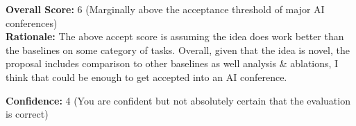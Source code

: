 \begin{tcolorbox}[colback=green!10!white, colframe=green!80!black, title=\textbf{Reviewer 1}]
\vspace{10pt}

\textbf{Overall Score:} 6 (Marginally above the acceptance threshold of major AI conferences)\\
\textbf{Rationale:} The above accept score is assuming the idea does work better than the baselines on some category of tasks. Overall, given that the idea is novel, the proposal includes comparison to other baselines as well analysis \& ablations, I think that could be enough to get accepted into an AI conference.

\vspace{10pt}

\textbf{Confidence:} 4 (You are confident but not absolutely certain that the evaluation is correct)
\end{tcolorbox}

\newpage

